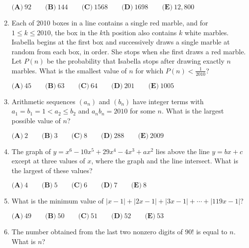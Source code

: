 \documentclass{article}
\begin{document}
\begin{enumerate}[label=\arabic*., itemsep=0.5em]
\(\textbf{(A)}\ 92 \qquad \textbf{(B)}\ 144 \qquad \textbf{(C)}\ 1568 \qquad \textbf{(D)}\ 1698 \qquad \textbf{(E)}\ 12,800\)\par \vspace{0.5em}\item Each of 2010 boxes in a line contains a single red marble, and for \(1 \le k \le 2010\), the box in the \(k\text{th}\) position also contains \(k\) white marbles. Isabella begins at the first box and successively draws a single marble at random from each box, in order. She stops when she first draws a red marble. Let \(P(n)\) be the probability that Isabella stops after drawing exactly \(n\) marbles. What is the smallest value of \(n\) for which \(P(n) < \frac{1}{2010}\)?

\(\textbf{(A)}\ 45 \qquad \textbf{(B)}\ 63 \qquad \textbf{(C)}\ 64 \qquad \textbf{(D)}\ 201 \qquad \textbf{(E)}\ 1005\)\par \vspace{0.5em}\item Arithmetic sequences \(\left(a_n\right)\) and \(\left(b_n\right)\) have integer terms with \(a_1=b_1=1<a_2 \le b_2\) and \(a_n b_n = 2010\) for some \(n\). What is the largest possible value of \(n\)?

\(\textbf{(A)}\ 2 \qquad \textbf{(B)}\ 3 \qquad \textbf{(C)}\ 8 \qquad \textbf{(D)}\ 288 \qquad \textbf{(E)}\ 2009\)\par \vspace{0.5em}\item The graph of \(y=x^6-10x^5+29x^4-4x^3+ax^2\) lies above the line \(y=bx+c\) except at three values of \(x\), where the graph and the line intersect. What is the largest of these values?

\(\textbf{(A)}\ 4 \qquad \textbf{(B)}\ 5 \qquad \textbf{(C)}\ 6 \qquad \textbf{(D)}\ 7 \qquad \textbf{(E)}\ 8\)\par \vspace{0.5em}\item What is the minimum value of \(\left|x-1\right| + \left|2x-1\right| + \left|3x-1\right| + \cdots + \left|119x - 1 \right|\)?

\(\textbf{(A)}\ 49 \qquad \textbf{(B)}\ 50 \qquad \textbf{(C)}\ 51 \qquad \textbf{(D)}\ 52 \qquad \textbf{(E)}\ 53\)\par \vspace{0.5em}\item The number obtained from the last two nonzero digits of \(90!\) is equal to \(n\). What is \(n\)?


\end{enumerate}
\end{document}
